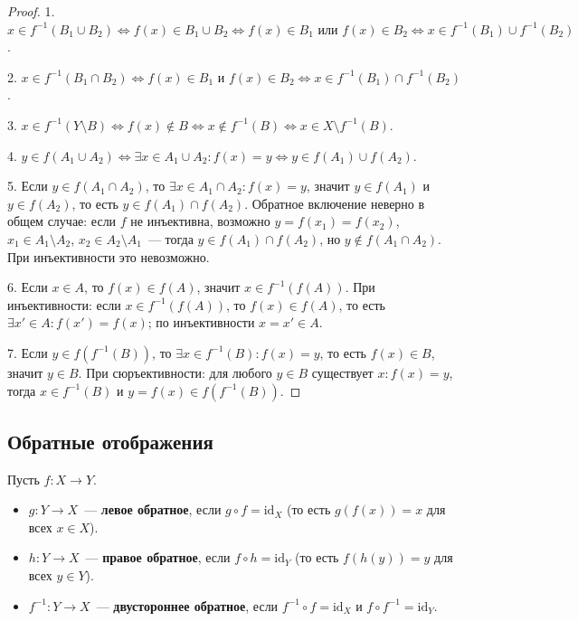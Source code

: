 \documentclass[12pt]{article}
\begin{document}
	\begin{proof}
		1. $x \in f^{-1}(B_1 \cup B_2) \Leftrightarrow f(x) \in B_1 \cup B_2 \Leftrightarrow f(x) \in B_1 \text{ или } f(x) \in B_2 \Leftrightarrow x \in f^{-1}(B_1) \cup f^{-1}(B_2)$.
		
		2. $x \in f^{-1}(B_1 \cap B_2) \Leftrightarrow f(x) \in B_1 \text{ и } f(x) \in B_2 \Leftrightarrow x \in f^{-1}(B_1) \cap f^{-1}(B_2)$.
		
		3. $x \in f^{-1}(Y \setminus B) \Leftrightarrow f(x) \notin B \Leftrightarrow x \notin f^{-1}(B) \Leftrightarrow x \in X \setminus f^{-1}(B)$.
		
		4. $y \in f(A_1 \cup A_2) \Leftrightarrow \exists x \in A_1 \cup A_2: f(x) = y \Leftrightarrow y \in f(A_1) \cup f(A_2)$.
		
		5. Если $y \in f(A_1 \cap A_2)$, то $\exists x \in A_1 \cap A_2: f(x) = y$, значит $y \in f(A_1)$ и $y \in f(A_2)$, то есть $y \in f(A_1) \cap f(A_2)$. Обратное включение неверно в общем случае: если $f$ не инъективна, возможно $y = f(x_1) = f(x_2)$, $x_1 \in A_1 \setminus A_2$, $x_2 \in A_2 \setminus A_1$~--- тогда $y \in f(A_1) \cap f(A_2)$, но $y \notin f(A_1 \cap A_2)$. При инъективности это невозможно.
		
		6. Если $x \in A$, то $f(x) \in f(A)$, значит $x \in f^{-1}(f(A))$. При инъективности: если $x \in f^{-1}(f(A))$, то $f(x) \in f(A)$, то есть $\exists x' \in A: f(x') = f(x)$; по инъективности $x = x' \in A$.
		
		7. Если $y \in f(f^{-1}(B))$, то $\exists x \in f^{-1}(B): f(x) = y$, то есть $f(x) \in B$, значит $y \in B$. При сюръективности: для любого $y \in B$ существует $x: f(x) = y$, тогда $x \in f^{-1}(B)$ и $y = f(x) \in f(f^{-1}(B))$.
	\end{proof}
	
	\subsection{Обратные отображения}
	
	\begin{definition}
		Пусть $f: X \to Y$.
		\begin{itemize}
			\item $g: Y \to X$~--- \textbf{левое обратное}, если $g \circ f = \text{id}_X$ (то есть $g(f(x)) = x$ для всех $x \in X$).
			\item $h: Y \to X$~--- \textbf{правое обратное}, если $f \circ h = \text{id}_Y$ (то есть $f(h(y)) = y$ для всех $y \in Y$).
			\item $f^{-1}: Y \to X$~--- \textbf{двустороннее обратное}, если $f^{-1} \circ f = \text{id}_X$ и $f \circ f^{-1} = \text{id}_Y$.
		\end{itemize}
	\end{definition}
	
\end{document}
